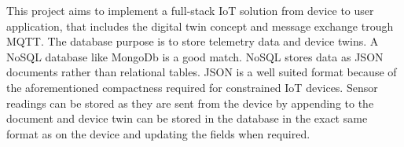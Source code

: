 This project aims to implement a full-stack IoT solution from device to user application, that includes the digital twin concept and message exchange trough MQTT. 
The database purpose is to store telemetry data and device twins. A NoSQL database like MongoDb \cite{mongo} is a good match. NoSQL stores data as JSON documents rather than relational tables. JSON is a well suited format because of the aforementioned compactness required for constrained IoT devices. Sensor readings can be stored as they are sent from the device by appending to the document and device twin can be stored in the database in the exact same format as on the device and updating the fields when required. 